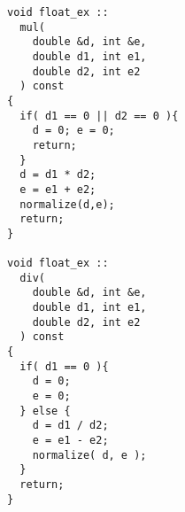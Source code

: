 \begin{verbatim}
void float_ex ::
  mul(
    double &d, int &e,
    double d1, int e1,
    double d2, int e2
  ) const
{
  if( d1 == 0 || d2 == 0 ){
    d = 0; e = 0;
    return;
  }
  d = d1 * d2;
  e = e1 + e2;
  normalize(d,e);
  return;
}

void float_ex ::
  div(
    double &d, int &e,
    double d1, int e1,
    double d2, int e2
  ) const
{
  if( d1 == 0 ){
    d = 0;
    e = 0;
  } else {
    d = d1 / d2;
    e = e1 - e2;
    normalize( d, e );
  }
  return;
}
\end{verbatim}
